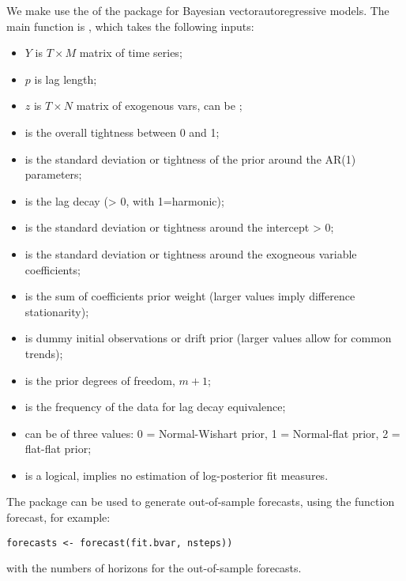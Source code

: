 \documentclass[12pt]{article}
\begin{document}
We make use the of the  package for Bayesian vectorautoregressive models. The main function is  , which takes the following inputs: 
\begin{itemize}
\item $Y$ is $T \times M$ matrix of time series; 
\item $p$ is lag length;
\item $z$ is $T \times N$ matrix of exogenous vars, can be ;
\item {} is the overall tightness between 0 and 1;
\item {} is the standard deviation or tightness of the prior around the AR(1) parameters;
\item {} is the lag decay (> 0, with 1=harmonic);
\item {} is the standard deviation or tightness around the intercept > 0;
\item {} is the standard deviation or tightness around the exogneous variable coefficients;
\item {} is the sum of coefficients prior weight (larger values imply difference stationarity);
\item {} is dummy initial observations or drift prior (larger values allow for common trends);
\item {} is the prior degrees of freedom, $m + 1$;
\item {} is the frequency of the data for lag decay equivalence;
\item {} can be of three values: 0 = Normal-Wishart prior, 1 = Normal-flat prior, 2 = flat-flat prior;
\item {} is a logical,  implies no estimation of log-posterior fit measures.
\end{itemize}
The package can be used to generate out-of-sample forecasts, using the function forecast, for example:
\begin{lstlisting}
forecasts <- forecast(fit.bvar, nsteps))
\end{lstlisting}
 \noindent with  the numbers of horizons for the out-of-sample forecasts.
\end{document}
